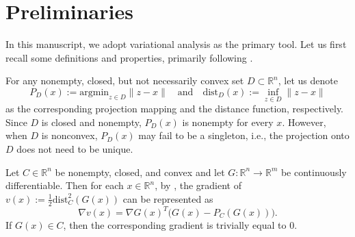 \documentclass[11pt,a4paper,reqno]{amsart}
\begin{document}
{\section{Preliminaries}\label{Sec:pre}
In this manuscript, we adopt variational analysis as the primary tool. Let us first recall some definitions and properties, primarily following \cite{rockafellar1998variational}.

For any nonempty, closed, but not necessarily convex set $D \subset \mathbb R^n$, let us denote 
\begin{equation*}
    P_D(x):= \text{argmin}_{z\in D}\|z-x\| \quad \text{and}\quad \text{dist}_D(x):=\inf_{z\in D}\|z-x\|
\end{equation*}
as the corresponding projection mapping and the distance function, respectively. Since $D$ is closed and nonempty, $P_D(x)$ is nonempty for every $x$. However, when $D$ is nonconvex, $P_D(x)$ may fail to be a singleton, i.e., the projection onto $D$ does not need to be unique.

Let $C \in \mathbb R^n$ be nonempty, closed, and convex and let $G: \mathbb R^n \to \mathbb R^m$ be continuously differentiable. Then for each $x\in \mathbb R ^n$, by \cite[Lemma~2.1]{de2023constrained}, the gradient of $v(x):=\frac{1}{2}\text{dist}^2_C(G(x))$ can be represented as
\begin{equation}\label{Eq:gradientProjec}
    \nabla v(x)=\nabla G(x)^T\big(G(x)-P_C(G(x))\big).
\end{equation}
If $G(x)\in C$, then the corresponding gradient is trivially equal to $0$.


}
\end{document}

